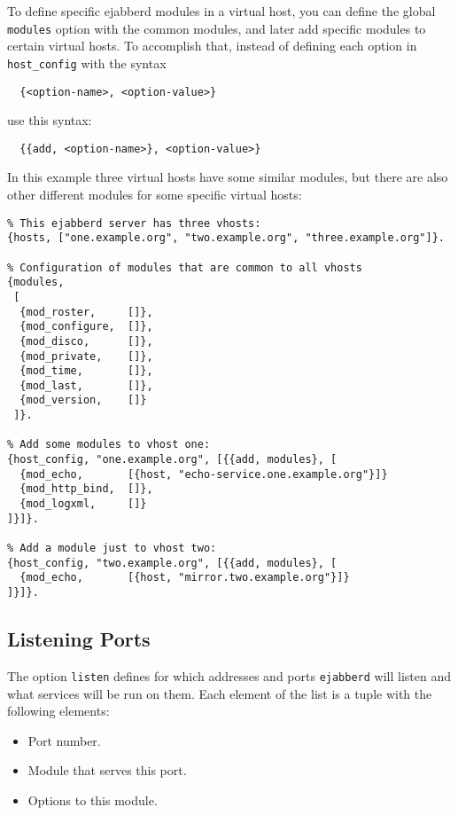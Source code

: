 \documentclass[a4paper,10pt]{book}
\newcommand{\ind}[1]{\begin{latexonly}\index{#1}\end{latexonly}}
\newcommand{\option}[1]{\texttt{#1}}
\newcommand{\term}[1]{\texttt{#1}}
\newcommand{\ejabberd}{\texttt{ejabberd}}
\begin{document}
To define specific ejabberd modules in a virtual host,
you can define the global \term{modules} option with the common modules,
and later add specific modules to certain virtual hosts.
To accomplish that, instead of defining each option in \term{host\_config} with the syntax
\begin{verbatim}
  {<option-name>, <option-value>}
\end{verbatim}
use this syntax:
\begin{verbatim}
  {{add, <option-name>}, <option-value>}
\end{verbatim}

In this example three virtual hosts have some similar modules, but there are also
other different modules for some specific virtual hosts:
\begin{verbatim}
% This ejabberd server has three vhosts:
{hosts, ["one.example.org", "two.example.org", "three.example.org"]}.

% Configuration of modules that are common to all vhosts
{modules,
 [
  {mod_roster,     []},
  {mod_configure,  []},
  {mod_disco,      []},
  {mod_private,    []},
  {mod_time,       []},
  {mod_last,       []},
  {mod_version,    []}
 ]}.

% Add some modules to vhost one:
{host_config, "one.example.org", [{{add, modules}, [
  {mod_echo,       [{host, "echo-service.one.example.org"}]}
  {mod_http_bind,  []},
  {mod_logxml,     []}
]}]}.

% Add a module just to vhost two:
{host_config, "two.example.org", [{{add, modules}, [
  {mod_echo,       [{host, "mirror.two.example.org"}]}
]}]}.
\end{verbatim}

\subsection{Listening Ports}
\label{listened}
\ind{options!listen}

The option \option{listen} defines for which addresses and ports \ejabberd{}
will listen and what services will be run on them. Each element of the list is a
tuple with the following elements:
\begin{itemize}
\item Port number.
\item Module that serves this port.
\item Options to this module.
\end{itemize}
\end{document}
